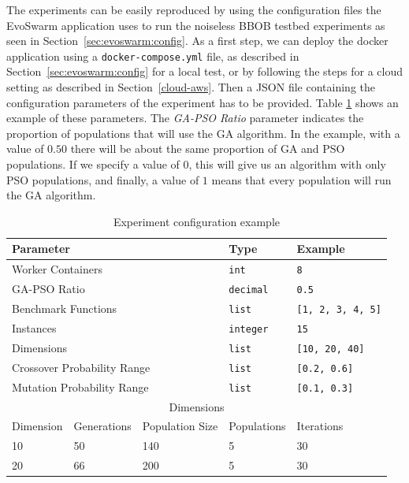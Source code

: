 \documentclass[review]{elsarticle}
\begin{document}
The experiments can be easily reproduced by using the configuration
files the EvoSwarm application uses to run the noiseless BBOB testbed
experiments as seen in Section~\ref{sec:evoswarm:config}. 
As a first step, we can deploy the docker application using a
{\tt docker-compose.yml} file, as described in Section~\ref{sec:evoswarm:config} for a local
test, or by following the steps for a cloud setting as described in Section~\ref{cloud-aws}. 
Then a JSON file containing the configuration parameters of the
experiment has to be provided.  Table \ref{tab:params} shows an example of these
parameters. The {\em GA-PSO Ratio} parameter indicates the proportion of
populations that will use the GA algorithm.  In the example, with a value of
$0.50$ there will be about the same proportion of GA and PSO populations. If we
specify a value of $0$, this will give us an algorithm with only PSO
populations, and finally, a value of  $1$ means that every population will run
the GA algorithm. 

\begin{table}[h!tbp]
  \small
  \caption{ Experiment configuration example 
  }
  \label{tab:params}
  \centering
  \small
  \begin{tabular}{|l|l|l|l|l|}
    \hline
    \multicolumn{3}{|l|}{Parameter}                    & Type             & Example         \\ \hline
    \multicolumn{3}{|l|}{Worker Containers}        & \texttt{int}     & \texttt{8} \\ \hline
    \multicolumn{3}{|l|}{GA-PSO Ratio}                 & \texttt{decimal} & \texttt{0.5}    \\  \hline
    \multicolumn{3}{|l|}{Benchmark Functions}          & \texttt{list}    & \texttt{[1, 2, 3, 4, 5]} \\ \hline
    \multicolumn{3}{|l|}{Instances}                    & \texttt{integer}    & \texttt{15} \\ \hline
    \multicolumn{3}{|l|}{Dimensions}                   & \texttt{list}    & \texttt{[10, 20, 40]}        \\ \hline
    \multicolumn{3}{|l|}{Crossover Probability Range}  & \texttt{list}    & \texttt{[0.2, 0.6]}      \\ \hline
    \multicolumn{3}{|l|}{Mutation  Probability Range}  & \texttt{list}    & \texttt{[0.1, 0.3]}      \\ \hline
    \multicolumn{5}{|c|}{Dimensions}                                                      \\ \hline  
    Dimension               & Generations & Population Size & Populations  &     Iterations    \\ \hline
            10              & 50      & 140                 &      5                 & 30                \\ \hline
            20              & 66      & 200                 &      5                 & 30               \\ \hline
  \end{tabular}
\end{table}
\end{document}
